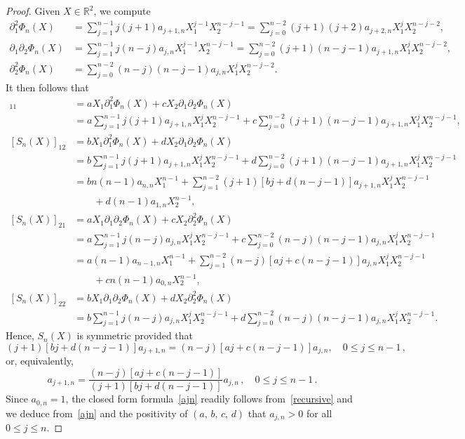 \documentclass[AHL,Unicode,longabstracts,published]{cedram}
\newcommand{\bbR}{\mathbb{R}}
\begin{document}
\begin{proof}
Given $X\in\bbR^2$, we compute
\begin{align*}
\partial_1^2 \Phi_n(X) & = \sum_{j=1}^{n-1} j(j+1) a_{j+1,n} X_1^{j-1} X_2^{n-j-1} = \sum_{j=0}^{n-2} (j+1)(j+2) a_{j+2,n} X_1^j X_2^{n-j-2}, \\
\partial_1 \partial_2 \Phi_n(X) & = \sum_{j=1}^{n-1} j(n-j) a_{j,n} X_1^{j-1} X_2^{n-j-1} = \sum_{j=0}^{n-2} (j+1)(n-j-1) a_{j+1,n} X_1^j X_2^{n-j-2}, \\
\partial_2^2 \Phi_n(X) & = \sum_{j=0}^{n-2} (n-j)(n-j-1) a_{j,n} X_1^j X_2^{n-j-2}.
\end{align*}
It then follows that
\begin{align*}
[S_n(X)]_{11} & = a X_1 \partial_1^2 \Phi_n(X) + c X_2 \partial_1 \partial_2 \Phi_n(X)\\
& = a \sum_{j=1}^{n-1} j(j+1) a_{j+1,n} X_1^j X_2^{n-j-1} + c \sum_{j=0}^{n-2} (j+1)(n-j-1) a_{j+1,n} X_1^j X_2^{n-j-1}, \\
[S_n(X)]_{12} & = bX_1 \partial_1^2\Phi_n(X) + d X_2 \partial_1 \partial_2 \Phi_n(X) \\
& = b \sum_{j=1}^{n-1} j(j+1) a_{j+1,n} X_1^j X_2^{n-j-1} + d \sum_{j=0}^{n-2} (j+1)(n-j-1) a_{j+1,n} X_1^j X_2^{n-j-1}\\
& = bn(n-1)a_{n,n}X_1^{n-1} +\sum_{j=1}^{n-2} (j+1)[bj+d(n-j-1)] a_{j+1,n} X_1^j X_2^{n-j-1} \\
& \qquad + d(n-1) a_{1,n} X_2^{n-1},\\
[S_n(X)]_{21} & = aX_1 \partial_1 \partial_2 \Phi_n(X) + c X_2 \partial_2^2 \Phi_n(X)\\
& = a \sum_{j=1}^{n-1} j(n-j) a_{j,n} X_1^{j} X_2^{n-j-1} +c \sum_{j=0}^{n-2} (n-j)(n-j-1) a_{j,n} X_1^j X_2^{n-j-1}\\
& = a (n-1)a_{n-1,n}X_1^{n-1}+\sum_{j=1}^{n-2} (n-j)[aj+c(n-j-1)] a_{j,n} X_1^{j} X_2^{n-j-1} \\
& \qquad + c n (n-1)a_{0,n} X_2^{n-1},\\
[S_n(X)]_{22} & = b X_1 \partial_1 \partial_2 \Phi_n(X) + d X_2 \partial_2^2 \Phi_n(X)\\
& = b \sum_{j=1}^{n-1} j(n-j) a_{j,n} X_1^{j} X_2^{n-j-1} + d \sum_{j=0}^{n-2} (n-j)(n-j-1) a_{j,n} X_1^j X_2^{n-j-1}.
\end{align*}
Hence, $S_n(X)$ is symmetric provided that
\begin{equation*}
(j+1)[bj+d(n-j-1)]a_{j+1,n}= (n-j)[aj+c(n-j-1)] a_{j,n},\quad 0\leq j\leq n-1\,,
\end{equation*}
or, equivalently,
\begin{equation}\label{recursive}
a_{j+1,n} = \frac{(n-j)[aj+c(n-j-1)]}{(j+1)[bj+d(n-j-1)]} a_{j,n}\,,\quad 0\leq j\leq n-1\,.
\end{equation}
Since $a_{0,n}=1$, the closed form formula~\eqref{ajn} readily follows from~\eqref{recursive} and we deduce from~\eqref{ajn} and the positivity of $(a,\,b,\,c,\, d)$ that $a_{j,n}>0$ for all $0\leq j\leq n$.
\end{proof}
\end{document}
